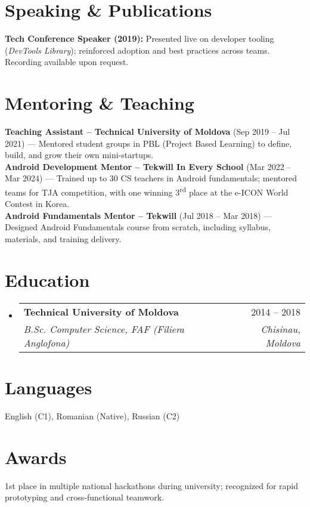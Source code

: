 \documentclass[a4paper,11pt]{article}
\makeatletter
\newcommand{\resumeQuadHeading}[4]{\item
  \begin{tabular*}{0.96\textwidth}[t]{l@{\extracolsep{\fill}}r}
    \textbf{#1} & #2 \\
    \textit{\small#3} & \textit{\small #4} \\
  \end{tabular*}
}
\newcommand{\resumeHeadingListStart}{\begin{itemize}[leftmargin=0.15in,label={}]}
\newcommand{\resumeHeadingListEnd}{\end{itemize}}
\makeatother
\begin{document}
\section{Speaking \& Publications}
\small{
\textbf{Tech Conference Speaker (2019):} Presented live on developer tooling (\textit{DevTools Library}); reinforced adoption and best practices across teams. Recording available upon request.
}

\section{Mentoring \& Teaching}
\small{
\textbf{Teaching Assistant – Technical University of Moldova} (Sep 2019 – Jul 2021) — Mentored student groups in PBL (Project Based Learning) to define, build, and grow their own mini-startups. \\
\textbf{Android Development Mentor – Tekwill In Every School} (Mar 2022 – Mar 2024) — Trained up to 30 CS teachers in Android fundamentals; mentored teams for TJA competition, with one winning 3\textsuperscript{rd} place at the e-ICON World Contest in Korea. \\
\textbf{Android Fundamentals Mentor – Tekwill} (Jul 2018 – Mar 2018) — Designed Android Fundamentals course from scratch, including syllabus, materials, and training delivery.
}

\section{Education}
\resumeHeadingListStart
  \resumeQuadHeading{Technical University of Moldova}{2014 -- 2018}{B.Sc. Computer Science, FAF (Filiera Anglofona)}{Chisinau, Moldova}
\resumeHeadingListEnd

\section{Languages}
\small{English (C1), Romanian (Native), Russian (C2)}

\section{Awards}
\small{1st place in multiple national hackathons during university; recognized for rapid prototyping and cross-functional teamwork.}
\end{document}
